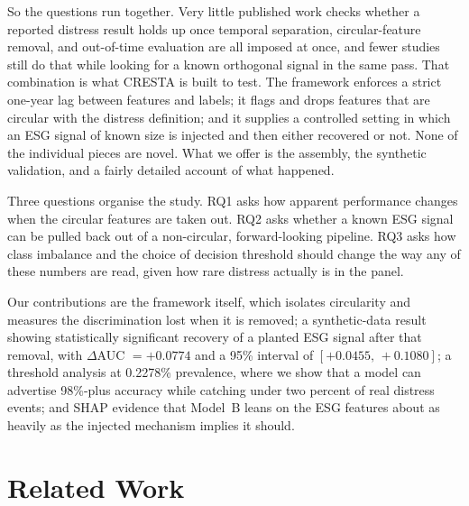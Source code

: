 \documentclass[conference]{IEEEtran}
\begin{document}
So the questions run together. Very little published work checks whether a
reported distress result holds up once temporal separation, circular-feature
removal, and out-of-time evaluation are all imposed at once, and fewer studies
still do that while looking for a known orthogonal signal in the same pass. That
combination is what CRESTA is built to test. The framework enforces a strict
one-year lag between features and labels; it flags and drops features that are
circular with the distress definition; and it supplies a controlled setting in
which an ESG signal of known size is injected and then either recovered or not.
None of the individual pieces are novel. What we offer is the assembly, the
synthetic validation, and a fairly detailed account of what happened.

Three questions organise the study. RQ1 asks how apparent performance changes
when the circular features are taken out. RQ2 asks whether a known ESG signal can
be pulled back out of a non-circular, forward-looking pipeline. RQ3 asks how
class imbalance and the choice of decision threshold should change the way any of
these numbers are read, given how rare distress actually is in the panel.

Our contributions are the framework itself, which isolates circularity and
measures the discrimination lost when it is removed; a synthetic-data result
showing statistically significant recovery of a planted ESG signal after that
removal, with $\Delta$AUC $= +0.0774$ and a 95\% interval of $[+0.0455,\,
+0.1080]$; a threshold analysis at 0.2278\% prevalence, where we show that a
model can advertise 98\%-plus accuracy while catching under two percent of real
distress events; and SHAP evidence that Model~B leans on the ESG features about
as heavily as the injected mechanism implies it should.

\section{Related Work}
\end{document}
